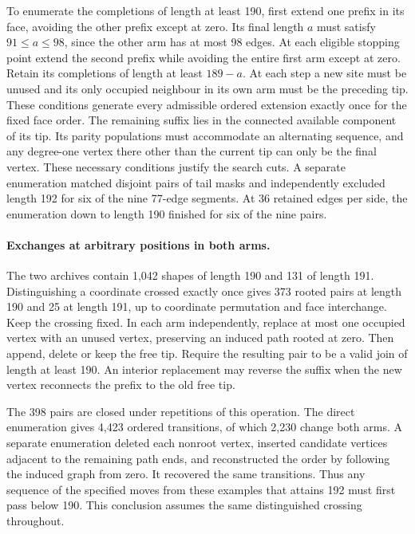 \documentclass[11pt,a4paper]{article}
\theoremstyle{definition}
\theoremstyle{remark}
\begin{document}
To enumerate the completions of length at least 190, first extend one
prefix in its face, avoiding the other prefix except at zero. Its final
length $a$ must satisfy $91\leq a\leq98$, since the other arm has at
most 98 edges. At each eligible stopping point extend the second prefix
while avoiding the entire first arm except at zero. Retain its completions
of length at least $189-a$. At each step a new site must be unused and its
only occupied neighbour in its own arm must be the preceding tip.
These conditions generate every admissible ordered extension exactly once
for the fixed face order. The remaining suffix lies in the connected
available component of its tip. Its parity populations must accommodate
an alternating sequence, and any degree-one vertex there other than
the current tip can only be the final vertex. These necessary conditions
justify the search cuts. A separate enumeration matched disjoint pairs
of tail masks and independently excluded length 192 for six of the nine
77-edge segments. At 36 retained edges per side, the enumeration down to
length 190 finished for six of the nine pairs.

\paragraph{Exchanges at arbitrary positions in both arms.}
The two archives contain 1,042 shapes of length 190 and 131 of length 191.
Distinguishing a coordinate crossed exactly once gives 373 rooted pairs
at length 190 and 25 at length 191, up to coordinate permutation and
face interchange. Keep the crossing fixed. In each arm independently,
replace at most one occupied vertex with an unused vertex, preserving an
induced path rooted at zero. Then append, delete or keep the free tip.
Require the resulting pair to be a valid join of length at least 190.
An interior replacement may reverse the suffix when the new vertex
reconnects the prefix to the old free tip.

The 398 pairs are closed under repetitions of this operation.
The direct enumeration gives 4,423 ordered transitions, of which 2,230
change both arms. A separate enumeration deleted each nonroot vertex,
inserted candidate vertices adjacent to the remaining path ends,
and reconstructed the order by following the induced graph from zero.
It recovered the same transitions. Thus any sequence of the specified
moves from these examples that attains 192 must first pass below 190.
This conclusion assumes the same distinguished crossing throughout.
\end{document}
